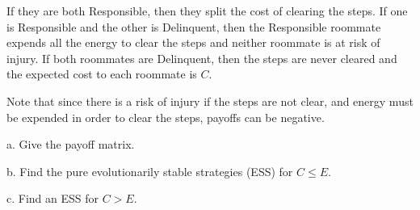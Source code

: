 \documentclass[reqno,12pt]{amsart}
\begin{document}
If they are both Responsible, then they split the cost of clearing
the steps.  If one is Responsible and the other is Delinquent, then
the Responsible roommate expends all the energy to clear the steps
and neither roommate is at risk of injury.  If both roommates
are Delinquent, then the steps are never cleared and the expected
cost to each roommate is $C$.

Note that since there is a risk of injury if the steps are not
clear, and energy must be expended in order to clear the steps,
payoffs can be negative.

\noindent
a.  Give the payoff matrix.

\noindent
b.  Find the pure evolutionarily stable strategies (ESS) for $C \le E$.

\noindent
c.  Find an ESS for $C>E$.
\end{document}
